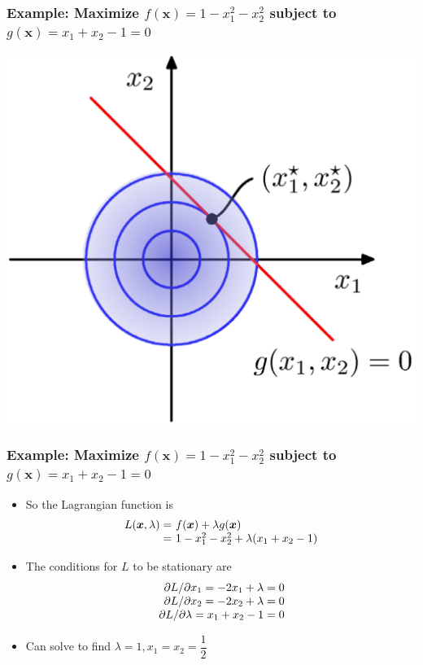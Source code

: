 \documentclass[12pt,notes,mathserif]{beamer}
\begin{document}
\begin{frame}[c]
\frametitle{Example: Maximize $f(\bm{x})=1-x_1^2-x_2^2$ subject to $g(\bm{x})=x_1+x_2-1=0$}
\begin{center}
\includegraphics[width=0.65\linewidth]{fig8/lec830.jpg}
\end{center}
\end{frame}


\begin{frame}[c]
\frametitle{Example: Maximize $f(\bm{x})=1-x_1^2-x_2^2$ subject to $g(\bm{x})=x_1+x_2-1=0$}
\begin{itemize}
\item So the Lagrangian function is
\[
\begin{array}{r@{~}l}
L(\bm{x},\lambda)=&f(\bm{x})+\lambda g(\bm{x})\\
=&1-x_1^2-x_2^2+\lambda(x_1+x_2-1)
\end{array}
\]
\item The conditions for $L$ to be stationary are
\[
\begin{array}{r@{~}l}
\partial L/\partial x_1=-2x_1+\lambda=0\\
\partial L/\partial x_2=-2x_2+\lambda=0\\
\partial L/\partial \lambda=x_1+x_2-1=0\\
\end{array}
\]
\item Can solve to find $\lambda=1,x_1=x_2=\dfrac{1}{2}$
\end{itemize}
\end{frame}
\end{document}
